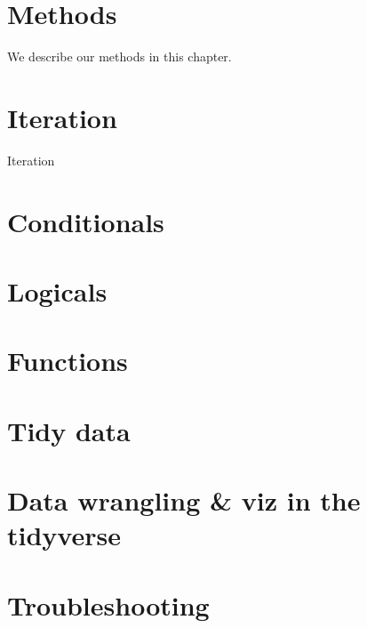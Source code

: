 \documentclass[
]{book}
\begin{document}
\hypertarget{methods}{%
\chapter{Methods}\label{methods}}

We describe our methods in this chapter.

\hypertarget{iteration}{%
\chapter{Iteration}\label{iteration}}

Iteration

\hypertarget{conditionals}{%
\chapter{Conditionals}\label{conditionals}}

\hypertarget{logicals}{%
\chapter{Logicals}\label{logicals}}

\hypertarget{functions}{%
\chapter{Functions}\label{functions}}

\hypertarget{tidydata}{%
\chapter{Tidy data}\label{tidydata}}

\hypertarget{tidyverse}{%
\chapter{Data wrangling \& viz in the tidyverse}\label{tidyverse}}

\hypertarget{troubleshooting}{%
\chapter{Troubleshooting}\label{troubleshooting}}

  
\end{document}
